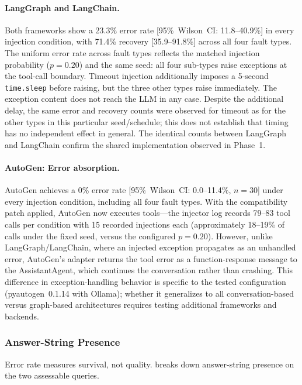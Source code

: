 \documentclass[make,article,submit,moreauthors,pdftex]{mdpi}
\begin{document}
\paragraph{LangGraph and LangChain.} Both frameworks show a 23.3\% error rate [95\%~Wilson~CI: 11.8--40.9\%] in every injection condition, with 71.4\% recovery [35.9--91.8\%] across all four fault types. The uniform error rate across fault types reflects the matched injection probability ($p = 0.20$) and the same seed: all four sub-types raise exceptions at the tool-call boundary. Timeout injection additionally imposes a 5-second \texttt{time.sleep} before raising, but the three other types raise immediately. The exception content does not reach the LLM in any case. Despite the additional delay, the same error and recovery counts were observed for timeout as for the other types in this particular seed/schedule; this does not establish that timing has no independent effect in general. The identical counts between LangGraph and LangChain confirm the shared implementation observed in Phase~1.

\paragraph{AutoGen: Error absorption.} AutoGen achieves a 0\% error rate [95\%~Wilson~CI: 0.0--11.4\%, $n = 30$] under every injection condition, including all four fault types. With the compatibility patch applied, AutoGen now executes tools---the injector log records 79--83 tool calls per condition with 15 recorded injections each (approximately 18--19\% of calls under the fixed seed, versus the configured $p = 0.20$). However, unlike LangGraph/LangChain, where an injected exception propagates as an unhandled error, AutoGen's adapter returns the tool error as a function-response message to the AssistantAgent, which continues the conversation rather than crashing. This difference in exception-handling behavior is specific to the tested configuration (pyautogen~0.1.14 with Ollama); whether it generalizes to all conversation-based versus graph-based architectures requires testing additional frameworks and backends.

\subsubsection{Answer-String Presence}\label{sec:phase2-correctness}

Error rate measures survival, not quality.  breaks down answer-string presence on the two assessable queries.
\end{document}
